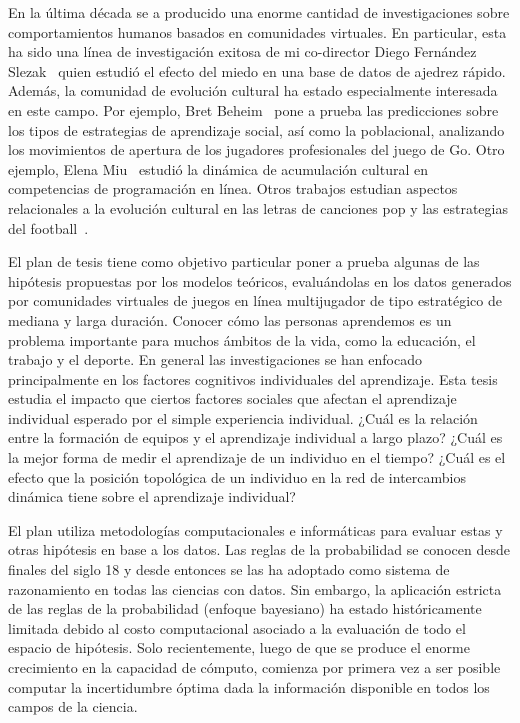 \documentclass[a4paper,11pt]{book}
\theoremstyle{definition}
\begin{document}
En la última década se a producido una enorme cantidad de investigaciones sobre comportamientos humanos basados en comunidades virtuales.
%
En particular, esta ha sido una línea de investigación exitosa de mi co-director Diego Fernández Slezak~\cite{slezak2012-doNotFearYourOpponent} quien estudió el efecto del miedo en una base de datos de ajedrez rápido.
%
Además, la comunidad de evolución cultural ha estado especialmente interesada en este campo.
%
Por ejemplo, Bret Beheim~\cite{Beheim2014} pone a prueba las predicciones sobre los tipos de estrategias de aprendizaje social, así como la poblacional, analizando los movimientos de apertura de los jugadores profesionales del juego de Go.
%
Otro ejemplo, Elena Miu~\cite{miu2018-cumulativeCultureOnlineProgrammingContests} estudió la dinámica de acumulación cultural en competencias de programación en línea.
%
Otros trabajos estudian aspectos relacionales a la evolución cultural en las letras de canciones pop \cite{brand2019-songLyrics} y las estrategias del football~\cite{mesoudi2020-footballTactics}.


El plan de tesis tiene como objetivo particular poner a prueba algunas de las hipótesis propuestas por los modelos te\'oricos, evaluándolas en los datos generados por comunidades virtuales de juegos en l\'inea multijugador de tipo estrat\'egico de mediana y larga duraci\'on.
%
Conocer c\'omo las personas aprendemos es un problema importante para muchos \'ambitos de la vida, como la educaci\'on, el trabajo y el deporte.
%
En general las investigaciones se han enfocado principalmente en los factores cognitivos individuales del aprendizaje.
%
Esta tesis estudia el impacto que ciertos factores sociales que afectan el aprendizaje individual esperado por el simple experiencia individual.
%
¿Cuál es la relaci\'on entre la formación de equipos y el aprendizaje individual a largo plazo?
%
¿Cuál es la mejor forma de medir el aprendizaje de un individuo en el tiempo?
%
¿Cu\'al es el efecto que la posici\'on topol\'ogica de un individuo en la red de intercambios dinámica tiene sobre el aprendizaje individual?


El plan utiliza metodologías computacionales e informáticas para evaluar estas y otras hipótesis en base a los datos.
%
Las reglas de la probabilidad se conocen desde finales del siglo 18 y desde entonces se las ha adoptado como sistema de razonamiento en todas las ciencias con datos.
%
Sin embargo, la aplicación estricta de las reglas de la probabilidad (enfoque bayesiano) ha estado históricamente limitada debido al costo computacional asociado a la evaluación de todo el espacio de hipótesis.
%
Solo recientemente, luego de que se produce el enorme crecimiento en la capacidad de cómputo, comienza por primera vez a ser posible computar la incertidumbre óptima dada la información disponible en todos los campos de la ciencia.
\end{document}
